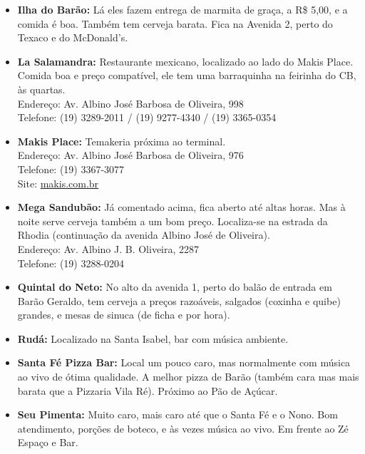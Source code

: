 \begin{itemize}
\item   \textbf{Ilha do Barão:} Lá eles fazem entrega de marmita de graça, a
        R\$ 5,00, e a comida é boa. Também tem cerveja barata. Fica na Avenida
        2, perto do Texaco e do McDonald's.

\item   \textbf{La Salamandra:} Restaurante mexicano, localizado ao lado do
        Makis Place. Comida boa e preço compatível, ele tem uma barraquinha na
        feirinha do CB, às quartas.
        \\Endereço: Av. Albino José Barbosa de Oliveira, 998
        \\Telefone: (19) 3289-2011 / (19) 9277-4340 / (19) 3365-0354

\item   \textbf{Makis Place:} Temakeria próxima ao terminal.
        \\Endereço: Av. Albino José Barbosa de Oliveira, 976
        \\Telefone: (19) 3367-3077
        \\Site: \url{makis.com.br}

\item   \textbf{Mega Sandubão:} Já comentado acima, fica aberto até altas horas.
        Mas à noite serve cerveja também a um bom preço. Localiza-se na estrada
        da Rhodia (continuação da avenida Albino José de Oliveira).
        \\Endereço: Av. Albino J. B. Oliveira, 2287
        \\Telefone: (19) 3288-0204

\item   \textbf{Quintal do Neto:} No alto da avenida 1, perto do balão de
        entrada em Barão Geraldo, tem cerveja a preços razoáveis, salgados
        (coxinha e quibe) grandes, e mesas de sinuca (de ficha e por hora).

\item   \textbf{Rudá:} Localizado na Santa Isabel, bar com música ambiente.

\item   \textbf{Santa Fé Pizza Bar:} Local um pouco caro, mas normalmente com
        música ao vivo de ótima qualidade. A melhor pizza de Barão (também cara
        mas mais barata que a Pizzaria Vila Ré). Próximo ao Pão de Açúcar.

\item   \textbf{Seu Pimenta:} Muito caro, mais caro até que o Santa Fé e o Nono.
        Bom atendimento, porções de boteco, e às vezes música ao vivo. Em frente
        ao Zé Espaço e Bar.


\end{itemize}
